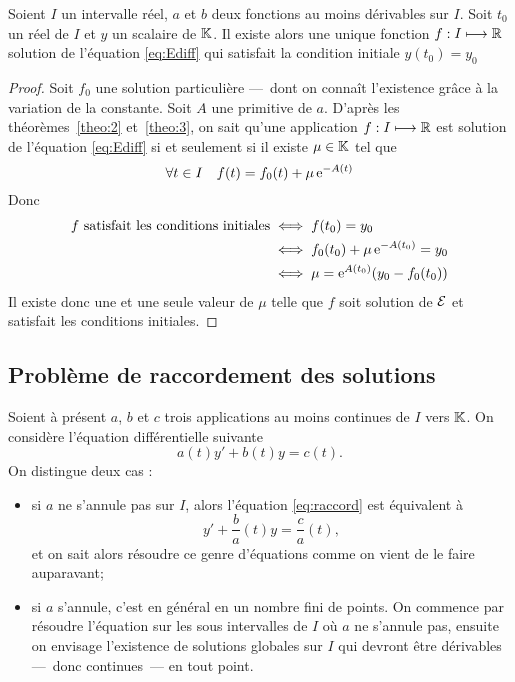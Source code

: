 %
\begin{theo} 
  \label{theo:4}
  Soient \(I\) un intervalle réel, \(a\) et \(b\) deux fonctions au moins dérivables sur \(I\). Soit \(t_0\) un réel de \(I\) et \(y\) un scalaire de \(\mathbb{K}\). Il existe alors une unique fonction \(f:I \longmapsto \mathbb{R}\) solution de l'équation \eqref{eq:Ediff} qui satisfait la condition initiale \(y(t_0)=y_0\)
\end{theo}
\begin{proof}
  Soit \(f_0\) une solution particulière ---~dont on connaît l'existence grâce à la variation de la constante. Soit \(A\) une primitive de \(a\). D'après les théorèmes~\ref{theo:2} et~\ref{theo:3}, on sait qu'une application \(f:I \longmapsto \mathbb{R}\) est solution de l'équation \eqref{eq:Ediff} si et seulement si il existe \(\mu \in \mathbb{K}\) tel que
  \begin{equation}
    \forall t \in I \quad f(t)=f_0(t) + \mu \operatorname{e}^{-A(t)}
  \end{equation}
Donc 
\begin{align}
  f \text{~satisfait les conditions initiales} & \iff f(t_0)=y_0 \\ & \iff f_0(t_0)+\mu\operatorname{e}^{-A(t_0)} = y_0 \\ & \iff \mu = \operatorname{e}^{A(t_0)}(y_0-f_0(t_0))
\end{align}
Il existe donc une et une seule valeur de \(\mu\) telle que \(f\) soit solution de \(\mathcal{E}\) et satisfait les conditions initiales.
\end{proof}

\subsection{Problème de raccordement des solutions}
\label{subsec:pbmraccordement}
Soient à présent \(a\), \(b\) et \(c\) trois applications au moins continues de \(I\) vers \(\mathbb{K}\). On considère l'équation différentielle suivante
\begin{equation}
  \label{eq:raccord}
  a(t) y'+b(t)y=c(t).
\end{equation}
On distingue deux cas :
\begin{itemize}
\item si \(a\) ne s'annule pas sur \(I\), alors l'équation \eqref{eq:raccord} est équivalent à
  \begin{equation}
    y' + \frac{b}{a}(t) y = \frac{c}{a}(t),
  \end{equation}
et on sait alors résoudre ce genre d'équations comme on vient de le faire auparavant;
\item si \(a\) s'annule, c'est en général en un nombre fini de points. On commence par résoudre l'équation sur les sous intervalles de \(I\) où \(a\) ne s'annule pas, ensuite on envisage l'existence de solutions globales sur \(I\) qui devront être dérivables ---~donc continues~--- en tout point.
\end{itemize}
%
